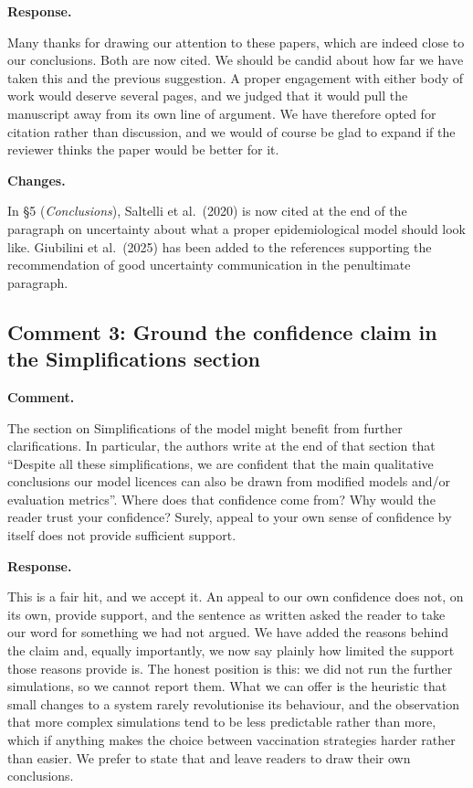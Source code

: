 \documentclass[a4paper,12pt]{article}
\newcommand{\reply}[1]{#1}
\newcommand{\rlabel}[1]{\par\medskip\noindent\textbf{#1}\par\nobreak}
\begin{document}
\rlabel{Response.}
\reply{Many thanks for drawing our attention to these papers, which are indeed
close to our conclusions. Both are now cited. We should be candid about how far
we have taken this and the previous suggestion. A proper engagement with either
body of work would deserve several pages, and we judged that it would pull the
manuscript away from its own line of argument. We have therefore opted for
citation rather than discussion, and we would of course be glad to expand if
the reviewer thinks the paper would be better for it.}

\rlabel{Changes.}
\reply{In \S5 (\emph{Conclusions}), Saltelli et al.\ (2020) is now cited at the
end of the paragraph on uncertainty about what a proper epidemiological model
should look like. Giubilini et al.\ (2025) has been added to the references
supporting the recommendation of good uncertainty communication in the
penultimate paragraph.}

\subsection*{Comment 3: Ground the confidence claim in the Simplifications section}

\rlabel{Comment.}
The section on Simplifications of the model might benefit from further clarifications. In particular, the authors write at the end of that section that ``Despite all these simplifications, we are confident that the main qualitative conclusions our model licences can also be drawn from modified models and/or evaluation metrics''. Where does that confidence come from? Why would the reader trust your confidence? Surely, appeal to your own sense of confidence by itself does not provide sufficient support.

\rlabel{Response.}
\reply{This is a fair hit, and we accept it. An appeal to our own confidence
does not, on its own, provide support, and the sentence as written asked the
reader to take our word for something we had not argued. We have added the
reasons behind the claim and, equally importantly, we now say plainly how
limited the support those reasons provide is. The honest position is this: we
did not run the further simulations, so we cannot report them. What we can
offer is the heuristic that small changes to a system rarely revolutionise its
behaviour, and the observation that more complex simulations tend to be less
predictable rather than more, which if anything makes the choice between
vaccination strategies harder rather than easier. We prefer to state that and
leave readers to draw their own conclusions.}
\end{document}
